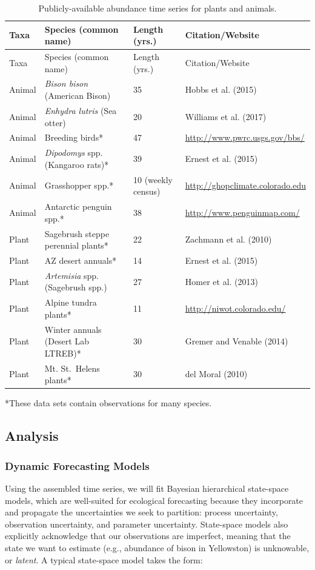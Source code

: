 \documentclass[12pt,]{article}
\begin{document}
\begin{longtable}[]{@{}llll@{}}
\caption{Publicly-available abundance time series for plants and
animals.}\tabularnewline
\toprule
Taxa & Species (common name) & Length (yrs.) &
Citation/Website\tabularnewline
\midrule
\endfirsthead
\toprule
Taxa & Species (common name) & Length (yrs.) &
Citation/Website\tabularnewline
\midrule
\endhead
Animal & \emph{Bison bison} (American Bison) & 35 & Hobbs et al.
(2015)\tabularnewline
Animal & \emph{Enhydra lutris} (Sea otter) & 20 & Williams et al.
(2017)\tabularnewline
Animal & Breeding birds* & 47 &
\url{http://www.pwrc.usgs.gov/bbs/}\tabularnewline
Animal & \emph{Dipodomys} spp. (Kangaroo rats)* & 39 & Ernest et al.
(2015)\tabularnewline
Animal & Grasshopper spp.* & 10 (weekly census) &
\url{http://ghopclimate.colorado.edu}\tabularnewline
Animal & Antarctic penguin spp.* & 38 &
\url{http://www.penguinmap.com/}\tabularnewline
Plant & Sagebrush steppe perennial plants* & 22 & Zachmann et al.
(2010)\tabularnewline
Plant & AZ desert annuals* & 14 & Ernest et al. (2015)\tabularnewline
Plant & \emph{Artemisia} spp. (Sagebrush spp.) & 27 & Homer et al.
(2013)\tabularnewline
Plant & Alpine tundra plants* & 11 &
\url{http://niwot.colorado.edu/}\tabularnewline
Plant & Winter annuals (Desert Lab LTREB)* & 30 & Gremer and Venable
(2014)\tabularnewline
Plant & Mt. St.~Helens plants* & 30 & del Moral (2010)\tabularnewline
\bottomrule
\end{longtable}

\vspace{-2em} *These data sets contain observations for many species.

\normalsize

\subsection{Analysis}\subsubsection{Dynamic Forecasting Models}

Using the assembled time series, we will fit Bayesian hierarchical
state-space models, which are well-suited for ecological forecasting
because they incorporate and propagate the uncertainties we seek to
partition: process uncertainty, observation uncertainty, and parameter
uncertainty. State-space models also explicitly acknowledge that our
observations are imperfect, meaning that the state we want to estimate
(e.g., abundance of bison in Yellowston) is unknowable, or
\emph{latent}. A typical state-space model takes the form:
\vspace{-1.5em}
\end{document}
